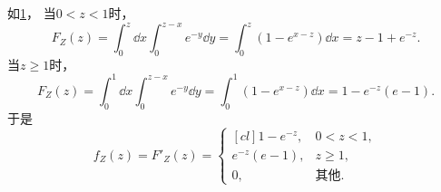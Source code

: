 \begin{example}
\begin{solution}
\begin{figure}
	\caption{}
	\label{figure:多维随机变量及其分布.二维连续型随机变量函数的分布.例2}
\end{figure}
如\cref{figure:多维随机变量及其分布.二维连续型随机变量函数的分布.例2}，
当\(0<z<1\)时，\begin{equation*}
	F_Z(z) = \int_0^z \dd{x} \int_0^{z-x} e^{-y} \dd{y}
	= \int_0^z (1-e^{x-z}) \dd{x}
	= z-1+e^{-z}.
\end{equation*}
当\(z\geq1\)时，\begin{equation*}
	F_Z(z) = \int_0^1 \dd{x} \int_0^{z-x} e^{-y} \dd{y}
	= \int_0^1 (1-e^{x-z}) \dd{x}
	= 1-e^{-z}(e-1).
\end{equation*}
于是\begin{equation*}
	f_Z(z) = F'_Z(z)
	= \begin{cases}[cl]
		1 - e^{-z}, & 0<z<1, \\
		e^{-z}(e-1), & z\geq1, \\
		0, & \text{其他}.
	\end{cases}
\end{equation*}
\end{solution}
\end{example}

